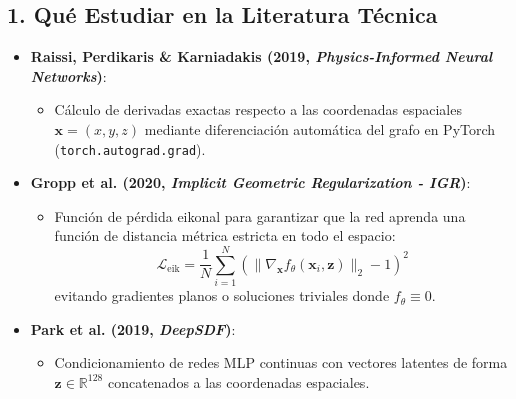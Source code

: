 \documentclass[11pt,a4paper]{article}
\begin{document}
\subsection{1. Qu{\'e} Estudiar en la Literatura T{\'e}cnica}
\begin{itemize}
    \item \textbf{Raissi, Perdikaris \& Karniadakis (2019, \textit{Physics-Informed Neural Networks})}:
    \begin{itemize}
        \item C{\'a}lculo de derivadas exactas respecto a las coordenadas espaciales $\mathbf{x} = (x, y, z)$ mediante diferenciaci{\'o}n autom{\'a}tica del grafo en PyTorch (\texttt{torch.autograd.grad}).
    \end{itemize}
    \item \textbf{Gropp et al. (2020, \textit{Implicit Geometric Regularization - IGR})}:
    \begin{itemize}
        \item Funci{\'o}n de p{\'e}rdida eikonal para garantizar que la red aprenda una funci{\'o}n de distancia m{\'e}trica estricta en todo el espacio:
        \begin{equation}
            \mathcal{L}_{\text{eik}} = \frac{1}{N} \sum_{i=1}^N \left( \|\nabla_\mathbf{x} f_\theta(\mathbf{x}_i, \mathbf{z})\|_2 - 1 \right)^2
        \end{equation}
        evitando gradientes planos o soluciones triviales donde $f_\theta \equiv 0$.
    \end{itemize}
    \item \textbf{Park et al. (2019, \textit{DeepSDF})}:
    \begin{itemize}
        \item Condicionamiento de redes MLP continuas con vectores latentes de forma $\mathbf{z} \in \mathbb{R}^{128}$ concatenados a las coordenadas espaciales.
    \end{itemize}
\end{itemize}
\end{document}
